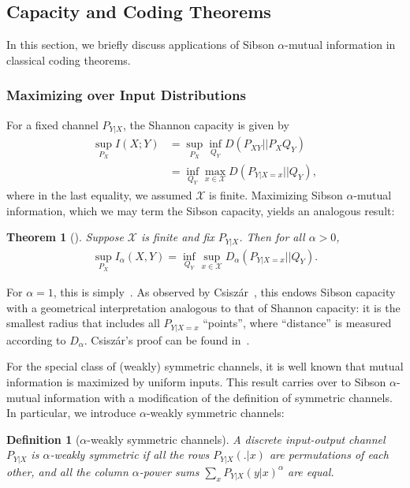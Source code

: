 \documentclass{article}
\newtheorem{theorem}{Theorem}
\numberwithin{theorem}{section}
\numberwithin{example}{section}
\numberwithin{remark}{section}
\newtheorem{definition}{Definition}
\numberwithin{definition}{section}
\newcommand{\X}{\mathcal{X}}
\newcommand{\revised}[1]{{\color{black} #1}}
\begin{document}
\subsection{Capacity and Coding Theorems}\label{sec:capacityAndCoding}

\revised{In this section, we briefly discuss applications of Sibson $\alpha$-mutual information in classical coding theorems.}

\subsubsection{Maximizing over Input Distributions}

For a fixed channel $P_{Y|X}$, the Shannon capacity is given by
\begin{align} \label{eq:max_MI}
    \sup_{P_X} I(X;Y) &= \sup_{P_X} \inf_{Q_Y} D(P_{XY} || P_X Q_Y) \\ &= \inf_{Q_Y} \max_{x \in \X} D(P_{Y|X=x} || Q_Y),
\end{align}
where in the last equality, we assumed $\X$ is finite. Maximizing Sibson $\alpha$-mutual information, which we may term the Sibson capacity, yields an analogous result:
\begin{theorem}[{\cite[Proposition 1]{csiszar:95}}]   \label{thm:sibson-capacity} Suppose $\X$ is finite and fix $P_{Y|X}$. Then for all $\alpha >0$,
\begin{align} \label{eq:thm-sibson-capacity}
    \sup_{P_X} I_\alpha (X,Y) = \inf_{Q_Y} \sup_{x \in \X} D_\alpha (P_{Y|X=x} || Q_Y).
\end{align}    
\end{theorem}
For $\alpha=1$, this is simply~. As observed by Csisz\'ar~\cite{csiszar:95}, this endows Sibson capacity with a geometrical interpretation analogous to that of Shannon capacity: it is the smallest radius that includes all $P_{Y|X=x}$ ``points'', where ``distance'' is measured according to $D_\alpha$. Csisz\'ar's proof can be found in~.

For the special class of (weakly) symmetric channels, it is well known that mutual information is maximized by uniform inputs. This result carries over to Sibson $\alpha$-mutual information with a modification of the definition of symmetric channels. In particular, we introduce $\alpha$-weakly symmetric channels:

\begin{definition}[$\alpha$-weakly symmetric channels] A discrete input-output channel $P_{Y|X}$ is $\alpha$-weakly symmetric if all the rows $P_{Y|X}(.|x)$ are permutations of each other, and all the column $\alpha$-power sums $\sum_{x} P_{Y|X}(y|x)^\alpha$ are equal.
\end{definition}
\end{document}
